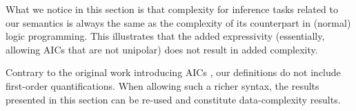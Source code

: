 What we notice in this section is that complexity for inference tasks related to our semantics is always the same as the complexity of its counterpart in (normal) logic programming. 
This illustrates that the added expressivity (essentially, allowing AICs that are not unipolar) does not result in added complexity. 



Contrary to the original work introducing AICs \cite{ppdp/FlescaGZ04}, our definitions do not include first-order quantifications. 
When allowing such a richer syntax, the results presented in this section can be re-used and constitute data-complexity results. 








